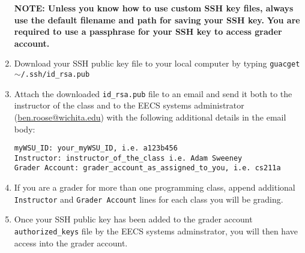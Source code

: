 \documentclass[12pt]{article}
\begin{document}
\begin{flushleft}
\begin{enumerate}
      \textbf{NOTE: Unless you know how to use custom SSH key files, always use the default filename and path for saving your SSH key.} \break
      \textbf{You are required to use a passphrase for your SSH key to access grader account.}
    
  \item Download your SSH public key file to your local computer by typing \break
  \texttt{guacget $\sim$/.ssh/id\_rsa.pub}
  \item Attach the downloaded \texttt{id\_rsa.pub} file to an email and send it both to the instructor of the class and to the EECS systems administrator (\href{mailto:ben.roose@wichita.edu}{ben.roose@wichita.edu}) with the following additional details in the email body:
\begin{verbatim}
myWSU_ID: your_myWSU_ID, i.e. a123b456
Instructor: instructor_of_the_class i.e. Adam Sweeney
Grader Account: grader_account_as_assigned_to_you, i.e. cs211a
\end{verbatim}
  \item If you are a grader for more than one programming class, append additional \texttt{Instructor} and \texttt{Grader Account} lines for each class you will be grading.
 \item Once your SSH public key has been added to the grader account \texttt{authorized\_keys} file by the EECS systems adminstrator, you will then have access into the grader account.
\end{enumerate}



\end{flushleft}
\end{document}
